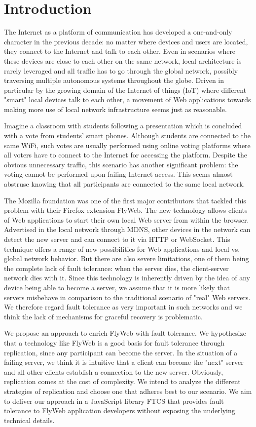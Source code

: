 \section{Introduction}
\label{sec:introduction}

The Internet as a platform of communication has developed a one-and-only character in the previous decade: no matter where devices and users are located, they connect to the Internet and talk to each other. Even in scenarios where these devices are close to each other on the same network, local architecture is rarely leveraged and all traffic has to go through the global network, possibly traversing multiple autonomous systems throughout the globe. Driven in particular by the growing domain of the Internet of things (IoT) where different "smart" local devices talk to each other, a movement of Web applications towards making more use of local network infrastructure seems just as reasonable.

Imagine a classroom with students following a presentation which is concluded with a vote from students' smart phones. Although students are connected to the same WiFi, such votes are usually performed using online voting platforms where all voters have to connect to the Internet for accessing the platform. Despite the obvious unnecessary traffic, this scenario has another significant problem: the voting cannot be performed upon failing Internet access. This seems almost abstruse knowing that all participants are connected to the same local network.

The Mozilla foundation was one of the first major contributors that tackled this problem with their Firefox extension FlyWeb. The new technology allows clients of Web applications to start their own local Web server from within the browser. Advertised in the local network through MDNS, other devices in the network can detect the new server and can connect to it via HTTP or WebSocket. This technique offers a range of new possibilities for Web applications and local vs. global network behavior. But there are also severe limitations, one of them being the complete lack of fault tolerance: when the server dies, the client-server network dies with it. Since this technology is inherently driven by the idea of any device being able to become a server, we assume that it is more likely that servers misbehave in comparison to the traditional scenario of "real" Web servers. We therefore regard fault tolerance as very important in such networks and we think the lack of mechanisms for graceful recovery is problematic.

We propose an approach to enrich FlyWeb with fault tolerance. We hypothesize that a technology like FlyWeb is a good basis for fault tolerance through replication, since any participant can become the server. In the situation of a failing server, we think it is intuitive that a client can become the "next" server and all other clients establish a connection to the new server. Obviously, replication comes at the cost of complexity. We intend to analyze the different strategies of replication and choose one that adheres best to our scenario. We aim to deliver our approach in a JavaScript library FTCS that provides fault tolerance to FlyWeb application developers without exposing the underlying technical details.